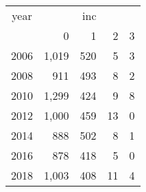 \footnotesize\begin{tabular}[t]{lrrrr}
\toprule
\multicolumn{1}{c}{year} & \multicolumn{4}{c}{inc} \\
\cmidrule(l{3pt}r{3pt}){1-1} \cmidrule(l{3pt}r{3pt}){2-5}
  & 0 & 1 & 2 & 3\\
\midrule
2006 & 1,019 & 520 & 5 & 3\\
2008 & 911 & 493 & 8 & 2\\
2010 & 1,299 & 424 & 9 & 8\\
2012 & 1,000 & 459 & 13 & 0\\
2014 & 888 & 502 & 8 & 1\\
2016 & 878 & 418 & 5 & 0\\
2018 & 1,003 & 408 & 11 & 4\\
\bottomrule
\end{tabular}
